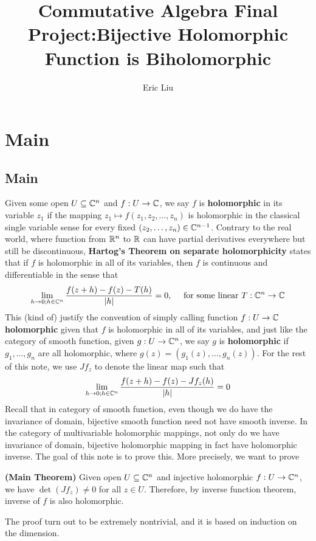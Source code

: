 \documentclass{report}
\title{Commutative Algebra Final Project:Bijective Holomorphic Function is Biholomorphic}
\author{Eric Liu}
\date{}
\begin{document}
\maketitle
\newpage%

\tableofcontents
\pagebreak
\chapter{Main}
\section{Main}
Given some open $U \subseteq \mathbb{C}^n$ and $f:U\rightarrow \mathbb{C}$, we say $f$ is \textbf{holomorphic} in its variable $z_1$ if the mapping $z_1 \mapsto f(z_1,z_2,\dots ,z_n)$ is holomorphic in the classical single variable sense for every fixed $(z_2,\dots ,z_n)\in\mathbb{C}^{n-1}$. Contrary to the real world, where function from $\mathbb{R}^n$ to $\mathbb{R}$ can have partial derivatives everywhere but still be discontinuous, \textbf{Hartog's Theorem on separate holomorphicity} states that if $f$ is holomorphic in all of its variables, then $f$ is continuous and differentiable in the sense that 
\begin{align*}
  \lim_{h\to 0;h\in\mathbb{C}^n} \frac{f(z+h)-f(z)-T(h)}{\left|h\right|}=0,\quad\text{ for some linear  }T:\mathbb{C}^n\rightarrow \mathbb{C}
\end{align*}
This (kind of) justify the convention of simply calling function $f:U\rightarrow \mathbb{C}$ \textbf{holomorphic} given that $f$ is holomorphic in all of its variables, and just like the category of smooth function, given $g:U\rightarrow \mathbb{C}^n$, we say $g$ is \textbf{holomorphic} if $g_1,\dots ,g_n$ are all holomorphic, where $g(z)=(g_1(z),\dots ,g_n(z))$. For the rest of this note, we use $Jf_z$ to denote the linear map such that 
\begin{align*}
\lim_{h\to 0;h\in\mathbb{C}^n} \frac{f(z+h)-f(z)-Jf_z(h)}{\left|h\right|}=0
\end{align*}
Recall that in category of smooth function, even though we do have the invariance of domain, bijective smooth function need not have smooth inverse. In the category of multivariable holomorphic mappings, not only do we have invariance of domain, bijective holomorphic mapping in fact have holomorphic inverse. The goal of this note is to prove this. More precisely, we want to prove 
\begin{theorem}
\textbf{(Main Theorem)} Given open $U\subseteq \mathbb{C}^n$ and injective holomorphic $f:U\rightarrow \mathbb{C}^n$, we have $\operatorname{det}(Jf_z)\neq 0$ for all $z \in U$. Therefore, by inverse function theorem, inverse of  $f$ is also holomorphic. 
\end{theorem}
The proof turn out to be extremely nontrivial, and it is based on induction on the dimension. 
\end{document}
